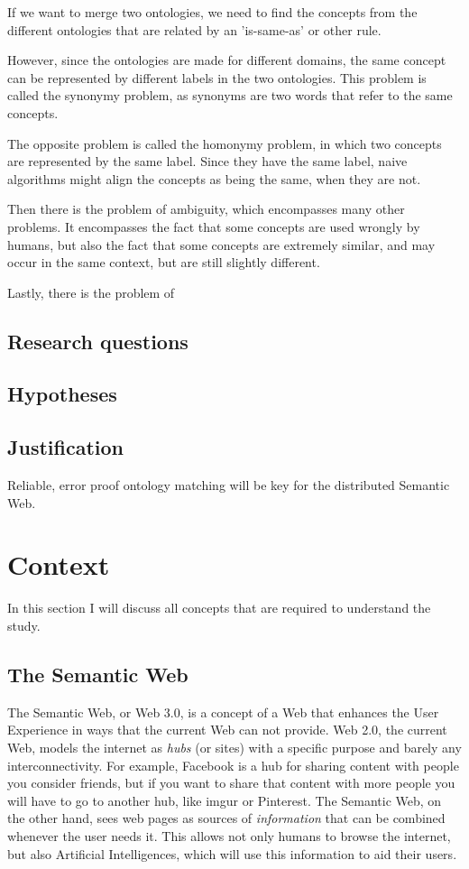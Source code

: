 \documentclass{article}
\begin{document}
 If we want to merge two ontologies, we need to find the concepts from the different ontologies that are related by an 'is-same-as' or other rule. 
 
 However, since the ontologies are made for different domains, the same concept can be represented by different labels in the two ontologies. This problem is called the synonymy problem, as synonyms are two words that refer to the same concepts.
 
 The opposite problem is called the homonymy problem, in which two concepts are represented by the same label. Since they have the same label, naive algorithms might align the concepts as being the same, when they are not.
 
 Then there is the problem of ambiguity, which encompasses many other problems. It encompasses the fact that some concepts are used wrongly by humans, but also the fact that some concepts are extremely similar, and may occur in the same context, but are still slightly different.
 
 Lastly, there is the problem of 
 \subsection{Research questions}
 
 \subsection{Hypotheses}
 
 
 \subsection{Justification}
 Reliable, error proof ontology matching will be key for the distributed Semantic Web.
 
 \section{Context}
 In this section I will discuss all concepts that are required to understand the study.
 \subsection{The Semantic Web}
 The Semantic Web, or Web 3.0, is a concept of a Web that enhances the User Experience in ways that the current Web can not provide. Web 2.0, the current Web, models the internet as \textit{hubs} (or sites) with a specific purpose and barely any interconnectivity. For example, Facebook is a hub for sharing content with people you consider friends, but if you want to share that content with more people you will have to go to another hub, like imgur or Pinterest.
The Semantic Web, on the other hand, sees web pages as sources of \textit{information} that can be combined whenever the user needs it. This allows not only humans to browse the internet, but also Artificial Intelligences, which will use this information to aid their users.
\end{document}
